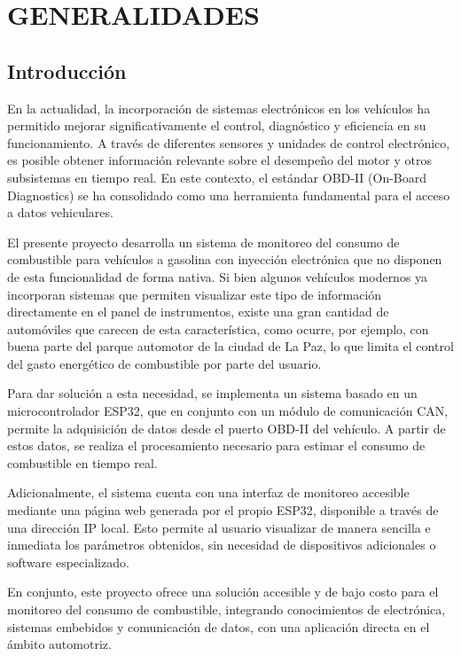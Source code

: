 \chapter{GENERALIDADES}
\section{Introducción}

En la actualidad, la incorporación de sistemas electrónicos en los vehículos ha permitido mejorar significativamente el control, diagnóstico y eficiencia en su funcionamiento. A través de diferentes sensores y unidades de control electrónico, es posible obtener información relevante sobre el desempeño del motor y otros subsistemas en tiempo real. En este contexto, el estándar OBD-II (On-Board Diagnostics) se ha consolidado como una herramienta fundamental para el acceso a datos vehiculares.

El presente proyecto desarrolla un sistema de monitoreo del consumo de combustible para vehículos a gasolina con inyección electrónica que no disponen de esta funcionalidad de forma nativa. Si bien algunos vehículos modernos ya incorporan sistemas que permiten visualizar este tipo de información directamente en el panel de instrumentos, existe una gran cantidad de automóviles que carecen de esta característica, como ocurre, por ejemplo, con buena parte del parque automotor de la ciudad de La Paz, lo que limita el control del gasto energético de combustible por parte del usuario.

Para dar solución a esta necesidad, se implementa un sistema basado en un microcontrolador ESP32, que en conjunto con un módulo de comunicación CAN, permite la adquisición de datos desde el puerto OBD-II del vehículo. A partir de estos datos, se realiza el procesamiento necesario para estimar el consumo de combustible en tiempo real.

Adicionalmente, el sistema cuenta con una interfaz de monitoreo accesible mediante una página web generada por el propio ESP32, disponible a través de una dirección IP local. Esto permite al usuario visualizar de manera sencilla e inmediata los parámetros obtenidos, sin necesidad de dispositivos adicionales o software especializado.

En conjunto, este proyecto ofrece una solución accesible y de bajo costo para el monitoreo del consumo de combustible, integrando conocimientos de electrónica, sistemas embebidos y comunicación de datos, con una aplicación directa en el ámbito automotriz.

